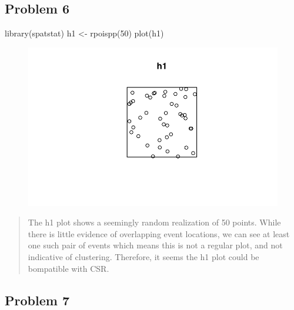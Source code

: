 \documentclass[
  letterpaper,
  DIV=11,
  numbers=noendperiod]{scrartcl}
\newenvironment{Shaded}{\begin{snugshade}}{\end{snugshade}}
\newcommand{\DecValTok}[1]{\textcolor[rgb]{0.68,0.00,0.00}{#1}}
\newcommand{\FunctionTok}[1]{\textcolor[rgb]{0.28,0.35,0.67}{#1}}
\newcommand{\NormalTok}[1]{\textcolor[rgb]{0.00,0.23,0.31}{#1}}
\newcommand{\OtherTok}[1]{\textcolor[rgb]{0.00,0.23,0.31}{#1}}
\begin{document}
\hypertarget{problem-6}{%
\subsection{Problem 6}\label{problem-6}}

\begin{Shaded}
\begin{Highlighting}[]
\FunctionTok{library}\NormalTok{(spatstat)}
\NormalTok{h1 }\OtherTok{\textless{}{-}} \FunctionTok{rpoispp}\NormalTok{(}\DecValTok{50}\NormalTok{)}
\FunctionTok{plot}\NormalTok{(h1)}
\end{Highlighting}
\end{Shaded}

\begin{figure}[H]

{\centering \includegraphics{robby_homework_1_files/figure-pdf/unnamed-chunk-6-1.pdf}

}

\end{figure}

\begin{quote}
The h1 plot shows a seemingly random realization of 50 points. While
there is little evidence of overlapping event locations, we can see at
least one such pair of events which means this is not a regular plot,
and not indicative of clustering. Therefore, it seems the h1 plot could
be bompatible with CSR.
\end{quote}

\hypertarget{problem-7}{%
\subsection{Problem 7}\label{problem-7}}
\end{document}
